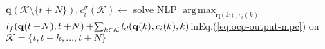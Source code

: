 \documentclass[letterpaper,10pt,conference,twoside]{IEEEtran}
\theoremstyle{definition}
\DeclareMathOperator*{\argmax}{arg\,max}
\begin{document}
\begin{algorithm}[t]
  \begin{algorithmic}[1]
    \small
      \makeatletter
      \setcounter{ALC@line}{15}
      \makeatother
      \color{black}\STATE $\mathbf{q}(\mathcal{K}\setminus\{t+N\}),c_i^\sigma(\mathcal{K})\gets${ \vspace*{.3ex}solve NLP }$\argmax_{\mathbf{q}(k),c_i(k)}$ \vspace*{.7ex}\hspace*{1em}${l_f(\mathbf{q}(t+\hspace*{-.4ex}N),t+\hspace*{-.4ex}N)}+\hspace*{-.5ex}{\sum_{k\in\mathcal{K}}{l_d(\mathbf{q}(k),c_i(k),k)}}${\hspace*{.4ex}in\hspace*{.4ex}Eq.\hspace*{.4ex}(\ref{eq:ocp-output-mpc}) \hspace*{1em}on }$\mathcal{K}=\{t,t+h,\dots,t+N\}$\vspace*{.3ex}\label{alg:mpc}
      

\end{algorithmic}
\end{algorithm}
\end{document}
